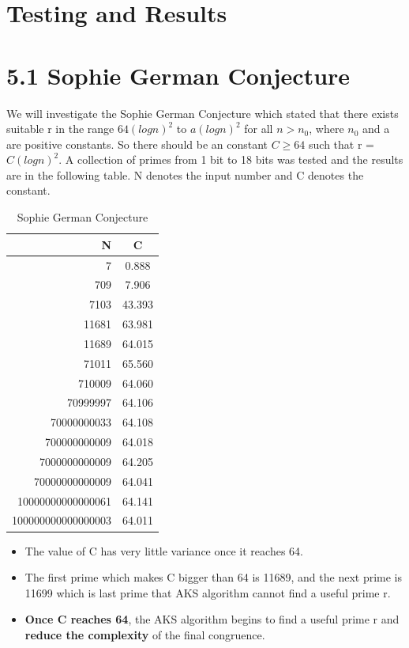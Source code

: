 \documentclass[a4paper,12pt]{article}
\begin{document}
\newpage
\section{Testing and Results}

\section*{\large 5.1 Sophie German Conjecture}

We will investigate the Sophie German Conjecture which stated that there exists suitable r in the range \(64(logn)^2\) to \(a(logn)^2\) for all \(n > n_{ 0}\), where \(n_{ 0}\) and a are positive constants. So there should be an constant \(C \geq 64\) such that r = \(C(logn)^2\). A collection of primes from 1 bit to 18 bits was tested and the results are in the following table. N denotes the input number and C denotes the constant.

\begin{table}[h!]
	\centering
	\caption{Sophie German Conjecture}
	\label{tab:table1}
	\vspace{0.1in}
	\begin{tabular}{|r|c|}
		\hline
		\ N & C \\
		\hline
		7 & 0.888 \\
		709 & 7.906 \\
		7103 & 43.393 \\
		11681 & 63.981 \\
		11689 & 64.015 \\
		71011 & 65.560 \\
		710009 & 64.060 \\
		70999997 & 64.106 \\
		70000000033 & 64.108 \\
		700000000009 & 64.018 \\ 
		7000000000009 & 64.205 \\
		70000000000009 & 64.041 \\
		10000000000000061 & 64.141 \\
		100000000000000003 & 64.011 \\
		\hline
	\end{tabular}
\end{table}

\begin{itemize}
	\setlength{\itemindent}{.1in}
	\item The value of C has very little variance once it reaches 64.
	\item The first prime which makes C bigger than 64 is 11689, and the next prime is 11699 which is last prime that AKS algorithm cannot find a useful prime r. 
	\item \textbf{Once C reaches 64}, the AKS algorithm begins to find a useful prime r and \textbf{reduce the complexity} of the final congruence.
\end{itemize}
\end{document}
